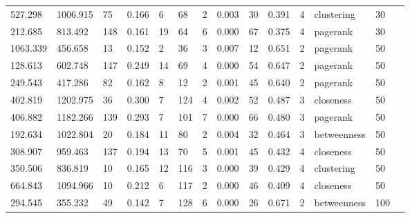 \documentclass[sn-mathphys-num]{sn-jnl}
\begin{document}
\begin{table}
{\begin{tabular}{@{}llllllllllllll@{}}
            527.298  & 1006.915  & 75       & 0.166     & 6          & 68          & 2           & 0.003 & 30         & 0.391    & 4         & clustering       & 30        \\
            212.685  & 813.492   & 148      & 0.161     & 19         & 64          & 6           & 0.000 & 67         & 0.375    & 4         & pagerank         & 30        \\
            \midrule
            1063.339 & 456.658   & 13       & 0.152     & 2          & 36          & 3           & 0.007 & 12         & 0.651    & 2         & pagerank         & 50        \\
            128.613  & 602.748   & 147      & 0.249     & 14         & 69          & 4           & 0.000 & 54         & 0.647    & 2         & pagerank         & 50        \\
            249.543  & 417.286   & 82       & 0.162     & 8          & 12          & 2           & 0.001 & 45         & 0.640    & 2         & pagerank         & 50        \\
            \midrule
            402.819  & 1202.975  & 36       & 0.300     & 7          & 124         & 4           & 0.002 & 52         & 0.487    & 3         & closeness        & 50        \\
            406.882  & 1182.266  & 139      & 0.293     & 7          & 101         & 7           & 0.000 & 66         & 0.480    & 3         & pagerank         & 50        \\
            192.634  & 1022.804  & 20       & 0.184     & 11         & 80          & 2           & 0.004 & 32         & 0.464    & 3         & betweenness      & 50        \\
            \midrule
            308.907  & 959.463   & 137      & 0.194     & 13         & 70          & 5           & 0.001 & 45         & 0.432    & 4         & closeness        & 50        \\
            350.506  & 836.819   & 10       & 0.165     & 12         & 116         & 3           & 0.000 & 39         & 0.429    & 4         & clustering       & 50        \\
            664.843  & 1094.966  & 10       & 0.212     & 6          & 117         & 2           & 0.000 & 46         & 0.409    & 4         & closeness        & 50        \\
            \midrule
            294.545  & 355.232   & 49       & 0.142     & 7          & 128         & 6           & 0.000 & 26         & 0.671    & 2         & betweenness      & 100       \\

\end{tabular}}
\end{table}
\end{document}
